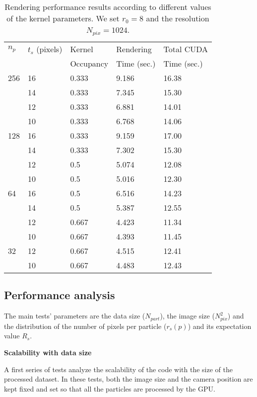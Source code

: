 \documentclass[11pt]{article}
\begin{document}
\begin{table}
\caption{Rendering performance results according to different values of the kernel parameters. We set $r_0=8$ and the resolution $N_{pix}=1024$.}
\begin{center}
\begin{tabular}{|l|l|l|l|l|}
\hline
$n_p$ & $t_s$ (pixels) & Kernel & Rendering & Total CUDA \\
& & Occupancy & Time (sec.) & Time (sec.) \\
\hline
256   & 16 & 0.333 & 9.186 & 16.38 \\
\hline
      & 14 & 0.333 & 7.345  & 15.30 \\
\hline
      & 12 & 0.333 & 6.881  & 14.01 \\
\hline
      & 10 & 0.333 & 6.768 & 14.06 \\
\hline
128   & 16 & 0.333 & 9.159 & 17.00 \\
\hline
      & 14 & 0.333 & 7.302  & 15.30 \\
\hline
      & 12 & 0.5 & 5.074  & 12.08 \\
\hline
      & 10 & 0.5 & 5.016 & 12.30 \\ 
\hline
64    & 16 & 0.5 & 6.516 & 14.23 \\
\hline
      & 14 & 0.5 & 5.387 & 12.55 \\
\hline
      & 12 & 0.667 & 4.423 & 11.34 \\
\hline
      & 10 & 0.667 & 4.393 & 11.45 \\ 
\hline
32    & 12 & 0.667 & 4.515 & 12.41 \\
\hline
      & 10 & 0.667 & 4.483 & 12.43 \\ 
\hline
\end{tabular}
\end{center}
\label{tab:tuning}
\end{table}

\subsection{Performance analysis}
\label{sec:performance}

The main tests' parameters are the data size ($N_{part}$),
the image size ($N_{pix}^2$) and the distribution of the number of pixels 
per particle ($r_s(p)$) and its expectation value $R_s$.

\medskip
\noindent 
{\bf Scalability with data size}

\noindent
A first series of tests analyze the scalability of the code
with the size of the processed dataset. In these tests, both the image size
and the camera position are kept fixed and set so that all the particles are processed 
by the GPU.
\end{document}
